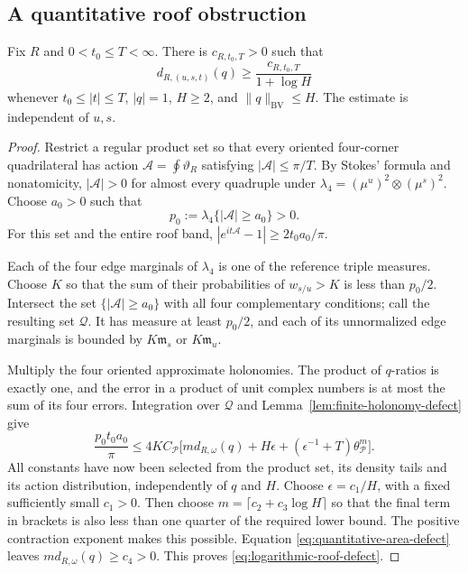 \subsection{A quantitative roof obstruction}
\begin{proposition}
\label{prop:logarithmic-roof-defect}
Fix $R$ and $0<t_0\le T<\infty$. There is $c_{R,t_0,T}>0$ such that
\begin{equation}\label{eq:logarithmic-roof-defect}
 d_{R,(u,s,t)}(q)\ge\frac{c_{R,t_0,T}}{1+\log H}
\end{equation}
whenever $t_0\le|t|\le T$, $|q|=1$, $H\ge2$, and
$\|q\|_{\mathrm{BV}}\le H$. The estimate is independent of $u,s$.
\end{proposition}
\begin{proof}
Restrict a regular product set so that every oriented four-corner
quadrilateral has action $\mathcal A=\oint\vartheta_R$ satisfying
$|\mathcal A|\le\pi/T$. By Stokes' formula and nonatomicity,
$|\mathcal A|>0$ for almost every quadruple under
$\lambda_4=(\mu^u)^2\otimes(\mu^s)^2$.
Choose $a_0>0$ such that
\[
 p_0:=\lambda_4\{|\mathcal A|\ge a_0\}>0.
\]
For this set and the entire roof band,
$|e^{it\mathcal A}-1|\ge2t_0a_0/\pi$.

Each of the four edge marginals of $\lambda_4$ is one of the reference
triple measures. Choose $K$ so that the sum of their probabilities
of $w_{s/u}>K$ is less than $p_0/2$. Intersect the set
$\{|\mathcal A|\ge a_0\}$ with all four complementary conditions;
call the resulting set $\mathcal Q$. It has measure at least $p_0/2$,
and each of its unnormalized edge marginals is bounded by
$K\mathfrak m_s$ or $K\mathfrak m_u$.

Multiply the four oriented approximate holonomies. The product of
$q$-ratios is exactly one, and the error in a product of unit complex
numbers is at most the sum of its four errors. Integration over
$\mathcal Q$ and Lemma~\ref{lem:finite-holonomy-defect} give
\begin{equation}\label{eq:quantitative-area-defect}
 \frac{p_0t_0a_0}{\pi}
 \le4K C_{\mathcal P}\bigl[
 m d_{R,\omega}(q)+H\epsilon
                  +(\epsilon^{-1}+T)\theta_{\mathcal P}^m\bigr].
\end{equation}
All constants have now been selected from the product set, its density
tails and its action distribution, independently of $q$ and $H$.
Choose $\epsilon=c_1/H$, with a fixed sufficiently small $c_1>0$.
Then choose $m=\lceil c_2+c_3\log H\rceil$ so that the final term in
brackets is also less than one quarter of the required lower bound.
The positive contraction exponent makes this possible. Equation
\eqref{eq:quantitative-area-defect} leaves $m d_{R,\omega}(q)\ge c_4>0$.
This proves \eqref{eq:logarithmic-roof-defect}.
\end{proof}

